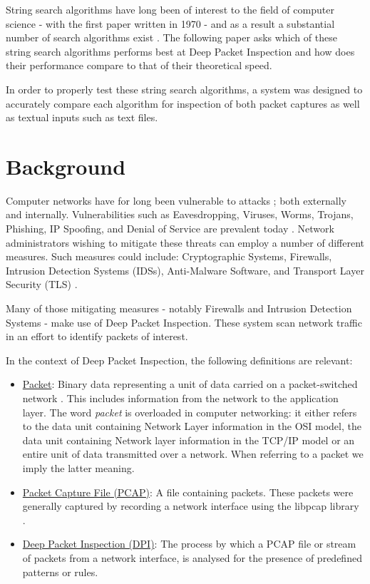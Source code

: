 \documentclass[9pt, conference]{IEEEtran}
\begin{document}
String search algorithms have long been of interest to the field of computer science - with the first paper written in 1970 \citep{morris1970} - and as a result a substantial number of search algorithms exist \cite{charras2004}. The following paper asks which of these string search algorithms performs best at Deep Packet Inspection and how does their performance compare to that of their theoretical speed.

In order to properly test these string search algorithms, a system was designed to accurately compare each algorithm for inspection of both packet captures as well as textual inputs such as text files.

\section{Background}

Computer networks have for long been vulnerable to attacks \citep{anderson1980, denning1987, stoll1989}; both externally and internally. Vulnerabilities such as Eavesdropping, Viruses, Worms, Trojans, Phishing, IP Spoofing, and Denial of Service are prevalent today \citep{daya2013}. Network administrators wishing to mitigate these threats can employ a number of different measures. Such measures could include: Cryptographic Systems, Firewalls, Intrusion Detection Systems (IDSs), Anti-Malware Software, and Transport Layer Security (TLS) \citep{daya2013}.

Many of those mitigating measures - notably Firewalls and Intrusion Detection Systems - make use of Deep Packet Inspection. These system scan network traffic in an effort to identify packets of interest.

In the context of Deep Packet Inspection, the following definitions are relevant:
\begin{itemize}
  \item \underline{Packet}: Binary data representing a unit of data carried on a packet-switched network . This includes information from the network to the application layer. The word \textit{packet} is overloaded in computer networking: it either refers to the data unit containing Network Layer information in the OSI model, the data unit containing Network layer information in the TCP/IP model or an entire unit of data transmitted over a network. When referring to a packet we imply the latter meaning.
  \item \underline{Packet Capture File (PCAP)}: A file containing packets. These packets were generally captured by recording a network interface using the libpcap library \citep{tcpdump2016}.
  \item \underline{Deep Packet Inspection (DPI)}: The process by which a PCAP file or stream of packets from a network interface, is analysed for the presence of predefined patterns or rules.
\end{itemize}
\end{document}

